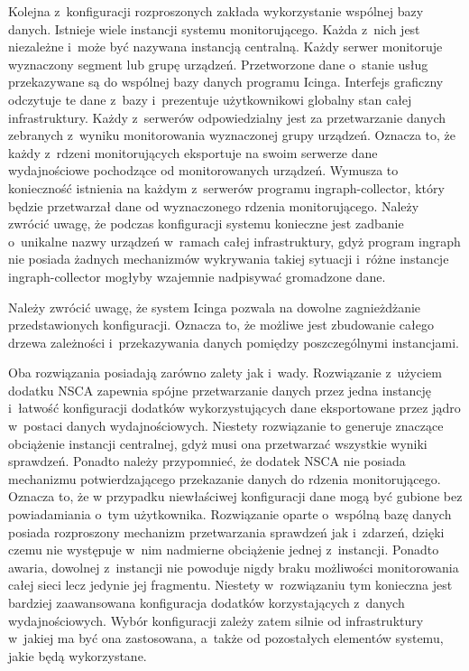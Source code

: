 Kolejna z~konfiguracji rozproszonych zakłada wykorzystanie wspólnej
bazy danych. Istnieje wiele instancji systemu monitorującego. Każda
z~nich jest niezależne i~może być nazywana instancją centralną. Każdy
serwer monitoruje wyznaczony segment lub grupę urządzeń. Przetworzone
dane o~stanie usług przekazywane są do wspólnej bazy danych programu
Icinga. Interfejs graficzny odczytuje te dane z~bazy i~prezentuje
użytkownikowi globalny stan całej infrastruktury. Każdy z~serwerów
odpowiedzialny jest za przetwarzanie danych zebranych z~wyniku
monitorowania wyznaczonej grupy urządzeń. Oznacza to, że każdy
z~rdzeni monitorujących eksportuje na swoim serwerze dane
wydajnościowe pochodzące od monitorowanych urządzeń. Wymusza to
konieczność istnienia na każdym z~serwerów programu ingraph-collector,
który będzie przetwarzał dane od wyznaczonego rdzenia
monitorującego. Należy zwrócić uwagę, że podczas konfiguracji systemu
konieczne jest zadbanie o~unikalne nazwy urządzeń w~ramach całej
infrastruktury, gdyż program ingraph nie posiada żadnych mechanizmów
wykrywania takiej sytuacji i~różne instancje ingraph-collector mogłyby
wzajemnie nadpisywać gromadzone dane.

Należy zwrócić uwagę, że system Icinga pozwala na dowolne
zagnieżdżanie przedstawionych konfiguracji. Oznacza to, że możliwe jest
zbudowanie całego drzewa zależności i~przekazywania danych pomiędzy
poszczególnymi instancjami.

Oba rozwiązania posiadają zarówno zalety jak i~wady. Rozwiązanie
z~użyciem dodatku NSCA zapewnia spójne przetwarzanie danych przez
jedna instancję i~łatwość konfiguracji dodatków wykorzystujących dane
eksportowane przez jądro w~postaci danych wydajnościowych. Niestety
rozwiązanie to generuje znaczące obciążenie instancji centralnej, gdyż
musi ona przetwarzać wszystkie wyniki sprawdzeń. Ponadto należy
przypomnieć, że dodatek NSCA nie posiada mechanizmu potwierdzającego
przekazanie danych do rdzenia monitorującego. Oznacza to, że w
przypadku niewłaściwej konfiguracji dane mogą być gubione bez
powiadamiania o~tym użytkownika. Rozwiązanie oparte o~wspólną bazę
danych posiada rozproszony mechanizm przetwarzania sprawdzeń jak
i~zdarzeń, dzięki czemu nie występuje w~nim nadmierne obciążenie
jednej z~instancji. Ponadto awaria, dowolnej z~instancji nie powoduje
nigdy braku możliwości monitorowania całej sieci lecz jedynie jej
fragmentu. Niestety w~rozwiązaniu tym konieczna jest bardziej
zaawansowana konfiguracja dodatków korzystających z~danych
wydajnościowych. Wybór konfiguracji zależy zatem silnie od
infrastruktury w~jakiej ma być ona zastosowana, a~także od pozostałych
elementów systemu, jakie będą wykorzystane.


